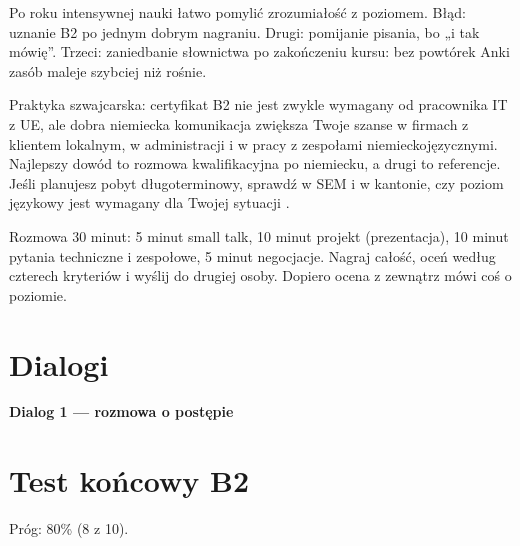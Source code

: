 \begin{falle}
Po roku intensywnej nauki łatwo pomylić zrozumiałość z poziomem. Błąd: uznanie B2 po jednym dobrym nagraniu. Drugi: pomijanie pisania, bo „i tak
mówię”. Trzeci: zaniedbanie słownictwa po zakończeniu kursu: bez powtórek Anki zasób maleje szybciej niż rośnie.
\end{falle}

\begin{szwajcaria}
Praktyka szwajcarska: certyfikat B2 nie jest zwykle wymagany od pracownika IT z UE, ale dobra niemiecka komunikacja zwiększa Twoje szanse w
firmach z klientem lokalnym, w administracji i w pracy z zespołami niemieckojęzycznymi. Najlepszy dowód to rozmowa kwalifikacyjna po niemiecku, a drugi to
referencje. Jeśli planujesz pobyt długoterminowy, sprawdź w SEM i w kantonie, czy poziom językowy jest wymagany dla Twojej sytuacji
.
\end{szwajcaria}

\begin{praca}
Rozmowa 30 minut: 5 minut small talk, 10 minut projekt (prezentacja), 10 minut pytania techniczne i zespołowe, 5 minut negocjacje. Nagraj całość,
oceń według czterech kryteriów i wyślij do drugiej osoby. Dopiero ocena z zewnątrz mówi coś o poziomie.
\end{praca}

\section{Dialogi}
\textbf{Dialog 1 --- rozmowa o postępie}
\begin{dialog}
\end{dialog}

\section{Test końcowy B2}
Próg: 80\% (8 z 10).

